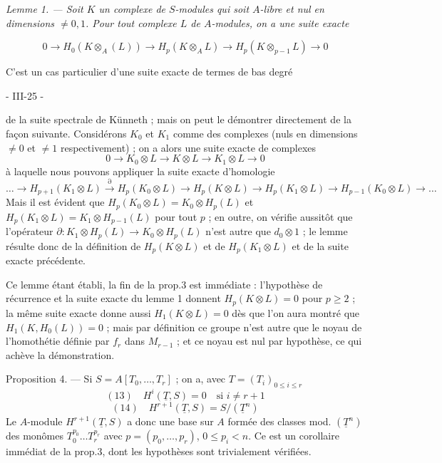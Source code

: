 \emph{Lemme 1. — Soit $K$ un complexe de $S$-modules qui soit $A$-libre et nul en dimensions $\neq 0, 1$. Pour tout complexe $L$ de $A$-modules, on a une suite exacte}

$$0 \to H_0(K \otimes_A (L)) \to H_p(K \otimes_A L) \to H_p(K \otimes_{p-1} L) \to 0$$

C'est un cas particulier d'une suite exacte de termes de bas degré

\newpage


- III-25 -

de la suite spectrale de Künneth ; mais on peut le démontrer directement de la façon suivante. Considérons $K_0$ et $K_1$ comme des complexes (nuls en dimensions $\neq 0$ et $\neq 1$ respectivement) ; on a alors une suite exacte de complexes
$$0 \to K_0 \otimes L \to K \otimes L \to K_1 \otimes L \to 0$$
à laquelle nous pouvons appliquer la suite exacte d'homologie
$$\dots \to H_{p+1}(K_1 \otimes L) \xrightarrow{\partial} H_p(K_0 \otimes L) \to H_p(K \otimes L) \to H_p(K_1 \otimes L) \to H_{p-1}(K_0 \otimes L) \to \dots$$
Mais il est évident que $H_p(K_0 \otimes L) = K_0 \otimes H_p(L)$ et $H_p(K_1 \otimes L) = K_1 \otimes H_{p-1}(L)$ pour tout $p$ ; en outre, on vérifie aussitôt que l'opérateur $\partial : K_1 \otimes H_p(L) \to K_0 \otimes H_p(L)$ n'est autre que $d_0 \otimes 1$ ; le lemme résulte donc de la définition de $H_p(K \otimes L)$ et de $H_p(K_1 \otimes L)$ et de la suite exacte précédente.

Ce lemme étant établi, la fin de la prop.3 est immédiate : l'hypothèse de récurrence et la suite exacte du lemme 1 donnent $H_p(K \otimes L) = 0$ pour $p \geq 2$ ; la même suite exacte donne aussi $H_1(K \otimes L) = 0$ dès que l'on aura montré que $H_1(K, H_0(L)) = 0$ ; mais par définition ce groupe n'est autre que le noyau de l'homothétie définie par $f_r$ dans $M_{r-1}$ ; et ce noyau est nul par hypothèse, ce qui achève la démonstration.

Proposition 4. — Si $S = A[T_0, \dots, T_r]$ ; on a, avec $T = (T_i)_{0 \leq i \leq r}$
$$(13) \quad H^i(\underline{T}, S) = 0 \quad \text{si } i \neq r+1$$
$$(14) \quad H^{r+1}(\underline{T}, S) = S/(\underline{T}^n)$$
Le $A$-module $H^{r+1}(\underline{T}, S)$ a donc une base sur $A$ formée des classes mod. $(\underline{T}^n)$ des monômes $T_0^{p_0} \dots T_r^{p_r}$ avec $p = (p_0, \dots, p_r)$, $0 \leq p_i < n$.
Ce est un corollaire immédiat de la prop.3, dont les hypothèses sont trivialement vérifiées.

